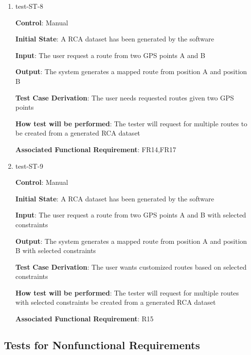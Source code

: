 \documentclass[12pt, titlepage]{article}
\begin{document}
\begin{enumerate}
\item{test-ST-8\\}

\textbf{Control}: Manual
					
\textbf{Initial State}: A RCA dataset has been generated by the software
					
\textbf{Input}: The user request a route from two GPS points A and B 
					
\textbf{Output}: The system generates a mapped route from position A and position B 

\textbf{Test Case Derivation}: The user needs requested routes given two GPS points

\textbf{How test will be performed}: The tester will request for multiple routes to be created from a generated RCA dataset

\textbf{Associated Functional Requirement}: FR14,FR17

\item{test-ST-9\\}

\textbf{Control}: Manual
					
\textbf{Initial State}: A RCA dataset has been generated by the software
					
\textbf{Input}: The user request a route from two GPS points A and B with selected constraints 
					
\textbf{Output}: The system generates a mapped route from position A and position B with selected constraints

\textbf{Test Case Derivation}: The user wants customized routes based on selected constraints 

\textbf{How test will be performed}: The tester will request for multiple routes with selected constraints be created from a generated RCA dataset

\textbf{Associated Functional Requirement}: R15

\end{enumerate}



\subsection{Tests for Nonfunctional Requirements}

\end{document}
